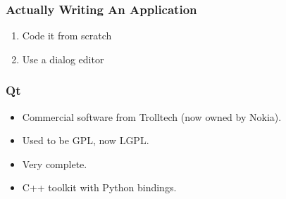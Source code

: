 \begin{frame}[fragile]
\frametitle{Actually Writing An Application}
\begin{enumerate}
\item Code it from scratch
\item Use a dialog editor
\end{enumerate}
\end{frame}

\begin{frame}[fragile]
\frametitle{Qt}
\begin{itemize}
\item Commercial software from Trolltech (now owned by Nokia).
\item Used to be GPL, now LGPL.
\item Very complete.
\item C++ toolkit with Python bindings.
\end{itemize}
\end{frame}


